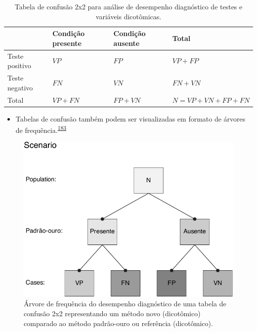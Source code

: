 \documentclass[
  a4paper,
]{book}
\providecommand{\tightlist}{%
  \setlength{\itemsep}{0pt}\setlength{\parskip}{0pt}}
\begin{document}
\begin{table}

\caption{\label{tab:crosstable}Tabela de confusão 2x2 para análise de desempenho diagnóstico de testes e variáveis dicotômicas.}
\centering
\begin{tabu} to 
\toprule
\textbf{ } & \textbf{Condição presente} & \textbf{Condição ausente} & \textbf{Total}\\
\midrule
Teste positivo & $VP$ & $FP$ & $VP+FP$\\
Teste negativo & $FN$ & $VN$ & $FN+VN$\\
Total & $VP+FN$ & $FP+VN$ & $N=VP+VN+FP+FN$\\
\bottomrule
\end{tabu}
\end{table}

\begin{itemize}
\tightlist
\item
  Tabelas de confusão também podem ser visualizadas em formato de árvores de frequência.\textsuperscript{\protect\hyperlink{ref-steckelberg2004}{183}}
\end{itemize}

\begin{figure}

{\centering \includegraphics{Ciencia-com-R_files/figure-latex/frequency-tree-1} 

}

\caption{Árvore de frequência do desempenho diagnóstico de uma tabela de confusão 2x2 representando um método novo (dicotômico) comparado ao método padrão-ouro ou referência (dicotômico).}\label{fig:frequency-tree}
\end{figure}
\end{document}
